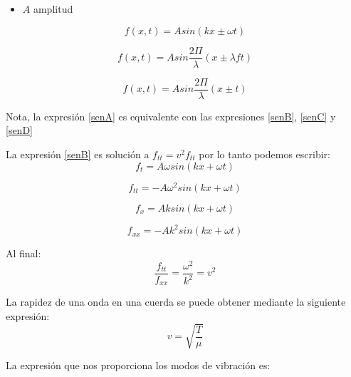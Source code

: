 \documentclass[]{article}
\begin{document}
\begin{itemize}
	\item $A$ amplitud
\end{itemize}


\begin{equation}
f(x,t)=Asin(k x \pm \omega t)
\label{senB}
\end{equation}


\begin{equation}
f(x,t)=A sin \frac{2 \Pi}{\lambda}( x \pm \lambda f t)
\label{senC}
\end{equation}


\begin{equation}
f(x,t)=A sin \frac{2 \Pi}{\lambda}( x \pm  t)
\label{senD}
\end{equation}

Nota, la expresión \ref{senA} es equivalente con las expresiones \ref{senB}, \ref{senC} y \ref{senD}

La expresión \ref{senB} es solución a $f_{tt}=v^2f_{tt}$ por lo tanto podemos escribir:\\

\begin{equation}
f_t=A \omega sin(kx+ \omega t)
\end{equation}

\begin{equation}
f_{tt}=-A \omega^2 sin(kx+\omega t)
\end{equation}


\begin{equation}
f_x=A k sin(kx+ \omega t)
\end{equation}


\begin{equation}
f_{xx}=-A k^2 sin(kx+\omega t)
\end{equation}

Al final:\\

\begin{equation}
\frac{f_{tt}}{f_{xx}}=\frac{\omega^2}{k^2} =v^2
\end{equation}

La rapidez de una onda en una cuerda se puede obtener mediante la siguiente expresión:\\

\begin{equation}
v=\sqrt{\frac{T}{\mu}}
\end{equation}

La expresión que nos proporciona los modos de vibración es:\\
\end{document}
